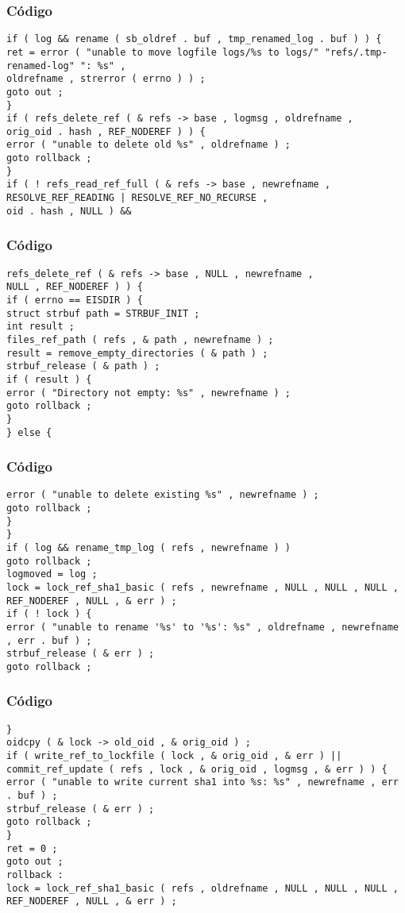 \documentclass{beamer}
\begin{document}
\begin{frame}[fragile]
\frametitle{C\'odigo}
\begin{verbatim}
if ( log && rename ( sb_oldref . buf , tmp_renamed_log . buf ) ) { 
ret = error ( "unable to move logfile logs/%s to logs/" "refs/.tmp-renamed-log" ": %s" , 
oldrefname , strerror ( errno ) ) ; 
goto out ; 
} 
if ( refs_delete_ref ( & refs -> base , logmsg , oldrefname , 
orig_oid . hash , REF_NODEREF ) ) { 
error ( "unable to delete old %s" , oldrefname ) ; 
goto rollback ; 
} 
if ( ! refs_read_ref_full ( & refs -> base , newrefname , 
RESOLVE_REF_READING | RESOLVE_REF_NO_RECURSE , 
oid . hash , NULL ) && 
\end{verbatim}
\end{frame}
\begin{frame}[fragile]
\frametitle{C\'odigo}
\begin{verbatim}
refs_delete_ref ( & refs -> base , NULL , newrefname , 
NULL , REF_NODEREF ) ) { 
if ( errno == EISDIR ) { 
struct strbuf path = STRBUF_INIT ; 
int result ; 
files_ref_path ( refs , & path , newrefname ) ; 
result = remove_empty_directories ( & path ) ; 
strbuf_release ( & path ) ; 
if ( result ) { 
error ( "Directory not empty: %s" , newrefname ) ; 
goto rollback ; 
} 
} else { 
\end{verbatim}
\end{frame}
\begin{frame}[fragile]
\frametitle{C\'odigo}
\begin{verbatim}
error ( "unable to delete existing %s" , newrefname ) ; 
goto rollback ; 
} 
} 
if ( log && rename_tmp_log ( refs , newrefname ) ) 
goto rollback ; 
logmoved = log ; 
lock = lock_ref_sha1_basic ( refs , newrefname , NULL , NULL , NULL , 
REF_NODEREF , NULL , & err ) ; 
if ( ! lock ) { 
error ( "unable to rename '%s' to '%s': %s" , oldrefname , newrefname , err . buf ) ; 
strbuf_release ( & err ) ; 
goto rollback ; 
\end{verbatim}
\end{frame}
\begin{frame}[fragile]
\frametitle{C\'odigo}
\begin{verbatim}
} 
oidcpy ( & lock -> old_oid , & orig_oid ) ; 
if ( write_ref_to_lockfile ( lock , & orig_oid , & err ) || 
commit_ref_update ( refs , lock , & orig_oid , logmsg , & err ) ) { 
error ( "unable to write current sha1 into %s: %s" , newrefname , err . buf ) ; 
strbuf_release ( & err ) ; 
goto rollback ; 
} 
ret = 0 ; 
goto out ; 
rollback : 
lock = lock_ref_sha1_basic ( refs , oldrefname , NULL , NULL , NULL , 
REF_NODEREF , NULL , & err ) ; 
\end{verbatim}
\end{frame}
\end{document}
